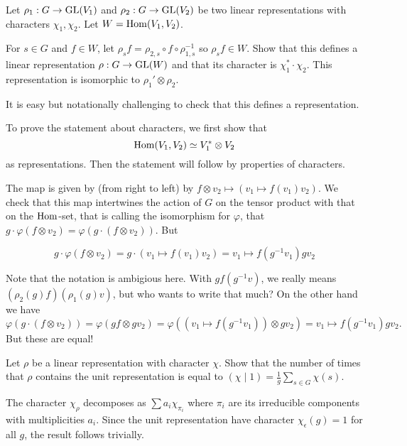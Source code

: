 \documentclass[11pt, english]{article}
\begin{document}
\begin{exc}
  Let $\rho_1:G \to \operatorname{GL}(V_1)$ and $\rho_2:G \to \operatorname{GL}(V_2)$ be two linear representations with characters $\chi_1, \chi_2$. Let $W= \operatorname{Hom}(V_1,V_2)$. 

For $s \in G$ and $f \in W$, let $\rho_s f = \rho_{2,s} \circ f \circ \rho_{1,s}^{-1}$ so $\rho_s f \in W$. Show that this defines a linear representation $\rho:G \to \operatorname{GL}(W)$ and that its character is $\chi_1^\ast \cdot \chi_2$. This representation is isomorphic to $\rho_1' \otimes \rho_2$.
\end{exc}

\begin{sol}
  It is easy but notationally challenging to check that this defines a representation.

To prove the statement about characters, we first show that
$$
\operatorname{Hom}(V_1, V_2) \simeq V_1^\ast \otimes V_2
$$
as representations. Then the statement will follow by properties of characters.

The map is given by (from right to left) by $f \otimes v_2 \mapsto (v_1 \mapsto f(v_1)v_2)$. We check that this map intertwines the action of $G$ on the tensor product with that on the $\operatorname{Hom}$-set, that is calling the isomorphism for $\varphi$, that $g \cdot \varphi(f \otimes v_2) = \varphi ( g \cdot (f \otimes v_2))$. But

$$
g \cdot \varphi( f \otimes v_2) = g \cdot (v_1 \mapsto f(v_1)v_2) = v_1 \mapsto f(g^{-1}v_1) g v_2
$$

Note that the notation is ambigious here. With $gf(g^{-1}v)$, we really means $(\rho_2(g)f)(\rho_1(g)v)$, but who wants to write that much? On the other hand we have
$$
\varphi ( g \cdot (f \otimes v_2)) = \varphi ( gf \otimes gv_2) = \varphi((v_1 \mapsto f(g^{-1}v_1)) \otimes gv_2) = v_1 \mapsto f(g^{-1}v_1)  g v_2.
$$
But these are equal!
\end{sol}

\begin{exc}[Exercise 2.5]
Let $\rho$ be a linear representation with character $\chi$. Show that the number of times that $\rho$ contains the unit representation is equal to $(\chi \mid 1)=\frac 1g \sum_{s \in G} \chi(s)$.  
\end{exc}

\begin{sol}
The character $\chi_\rho$ decomposes as $\sum a_i \chi_{\pi_i}$ where $\pi_i$ are its irreducible components with multiplicities $a_i$. Since the unit representation have character $\chi_\epsilon(g)=1$ for all $g$, the result follows trivially.
\end{sol}
\end{document}
